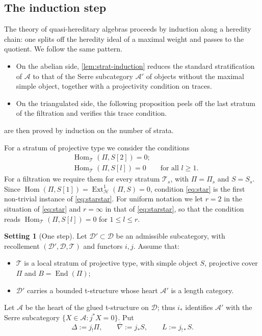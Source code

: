 \documentclass[11pt,reqno]{amsart}
\theoremstyle{plain}
\theoremstyle{definition}
\newtheorem{setting}[theorem]{Setting}
\theoremstyle{remark}
\DeclareMathOperator{\Hom}{Hom}
\DeclareMathOperator{\End}{End}
\DeclareMathOperator{\Ext}{Ext}
\newcommand{\nablabar}{\overline{\nabla}}
\newcommand{\cD}{\mathcal{D}}
\newcommand{\cA}{\mathcal{A}}
\newcommand{\cH}{\mathcal{H}}
\newcommand{\cT}{\mathcal{T}}
\begin{document}
\subsection{The induction step}
The theory of quasi-hereditary algebras proceeds by induction along a heredity chain: one splits off the heredity ideal of a maximal weight and passes to the quotient. We follow the same pattern.
\begin{itemize}
\item On the abelian side, \cref{lem:strat-induction} reduces the standard stratification of $\cA$ to that of the Serre subcategory $\cA'$ of objects without the maximal simple object, together with a projectivity condition on traces.
\item On the triangulated side, the following proposition peels off the last stratum of the filtration and verifies this trace condition.
\end{itemize}
 are then proved by induction on the number of strata.

For a stratum of projective type we consider the conditions
\begin{align}
&\Hom_{\cT}(\Pi,S[2])=0;\label{eq:star}\tag{$\star$}\\
&\Hom_{\cT}(\Pi,S[l])=0\qquad\text{for all }l\ge1.\label{eq:starstar}\tag{$\star\star$}
\end{align}
For a filtration we require them for every stratum $\cT_s$, with $\Pi=\Pi_s$ and $S=S_s$. Since $\Hom(\Pi,S[1])=\Ext^1_\cH(\Pi,S)=0$, condition \eqref{eq:star} is the first non-trivial instance of \eqref{eq:starstar}. For uniform notation we let $r=2$ in the situation of \eqref{eq:star} and $r=\infty$ in that of \eqref{eq:starstar}, so that the condition reads $\Hom_\cT(\Pi,S[l])=0$ for $1\le l\le r$.

\begin{setting}[One step]\label{set:step}
Let $\cD'\subset\cD$ be an admissible subcategory, with recollement $(\cD',\cD,\cT)$ and functors $i,j$. Assume that:
\begin{itemize}
\item $\cT$ is a local stratum of projective type, with simple object $S$, projective cover $\Pi$ and $B=\End(\Pi)$;
\item $\cD'$ carries a bounded t-structure whose heart $\cA'$ is a length category.
\end{itemize}
Let $\cA$ be the heart of the glued t-structure on $\cD$; thus $i_*$ identifies $\cA'$ with the Serre subcategory $\{X\in\cA:j^*X=0\}$. Put
\[\Delta:=j_!\Pi,\qquad\nablabar:=j_*S,\qquad L:=j_{!*}S.\]
\end{setting}
\end{document}
